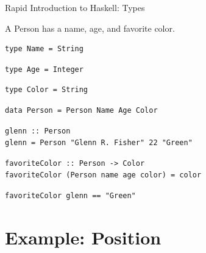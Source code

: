 \documentclass[8pt,aspectratio=169]{beamer}
\begin{document}

\begin{frame}[fragile]{Rapid Introduction to Haskell: Types}

\pause
A Person has a name, age, and favorite color.

\pause
\begin{verbatim}
type Name = String
\end{verbatim}

\pause
\begin{verbatim}
type Age = Integer
\end{verbatim}

\pause
\begin{verbatim}
type Color = String
\end{verbatim}

\pause
\begin{verbatim}
data Person = Person Name Age Color
\end{verbatim}

\pause
\begin{verbatim}
glenn :: Person
glenn = Person "Glenn R. Fisher" 22 "Green"
\end{verbatim}

\pause
\begin{verbatim}
favoriteColor :: Person -> Color
favoriteColor (Person name age color) = color
\end{verbatim}

\pause
\begin{verbatim}
favoriteColor glenn == "Green"
\end{verbatim}

\end{frame}


\section{Example: Position}

\end{document}
